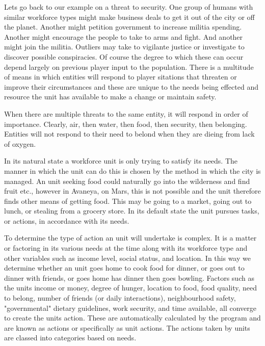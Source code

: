 Lets go back to our example on a threat to security. One group of humans with similar workforce types might make business deals to get it out of the city or off the planet. Another might petition government to increase militia spending. Another might encourage the people to take to arms and fight. And another might join the militia. Outliers may take to vigilante justice or investigate to discover possible conspiracies. Of course the degree to which these can occur depend largely on previous player input to the population. There is a multitude of means in which entities will respond to player sitations that threaten or improve their circumstances and these are unique to the needs being effected and resource the unit has available to make a change or maintain safety.

When there are multiple threats to the same entity, it will respond in order of importance. Clearly, air, then water, then food, then security, then belonging. Entities will not respond to their need to belond when they are dieing from lack of oxygen.

In its natural state a workforce unit is only trying to satisfy its needs. The manner in which the unit can do this is chosen by the method in which the city is managed. An unit seeking food could naturally go into the wilderness and find fruit etc., however in Avaneya, on Mars, this is not possible and the unit therefore finds other means of getting food. This may be going to a market, going out to lunch, or stealing from a grocery store. In its default state the unit pursues tasks, or actions, in accordance with its needs.

To determine the type of action an unit will undertake is complex. It is a matter or factoring in its various needs at the time along with its workforce type and other variables such as income level, social status, and location. In this way we determine whether an unit goes home to cook food for dinner, or goes out to dinner with friends, or goes home has dinner then goes bowling. Factors such as the units income or money, degree of hunger, location to food, food quality, need to belong, number of friends (or daily interactions), neighbourhood safety, "governmental" dietary guidelines, work security, and time available, all converge to create the units action. These are automatically calculated by the program and are known as actions or specifically as unit actions. The actions taken by units are classed into categories based on needs. 

